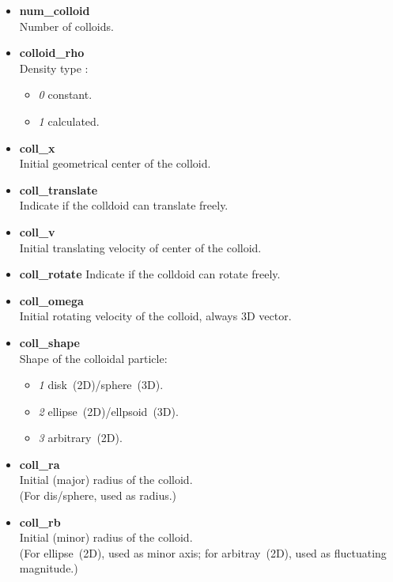 \documentclass[a4paper,10pt]{article}
\begin{document}
\begin{itemize}
 
\item  
\textbf{num\_colloid} \\
Number of colloids.

\item 
\textbf{colloid\_rho}  \\
Density type :
\begin{itemize}
\item
\textit{0} constant.
\item 
\textit{1} calculated.
\end{itemize}

\item 
\textbf{coll\_x}   \\
Initial geometrical center of the colloid.

\item 
\textbf{coll\_translate} \\
Indicate if the colldoid can translate freely.

\item 
\textbf{coll\_v}\\
Initial translating velocity of center of the colloid.

\item 
\textbf{coll\_rotate}
Indicate if the colldoid can rotate freely.

\item 
\textbf{coll\_omega}  \\
Initial rotating velocity of the colloid, always 3D vector.

\item 
\textbf{coll\_shape} \\
Shape of the colloidal particle:
\begin{itemize}
\item \textit{1} disk~(2D)/sphere~(3D).
\item \textit{2} ellipse~(2D)/ellpsoid~(3D).
\item \textit{3} arbitrary~(2D).
\end{itemize}

\item  
\textbf{coll\_ra} \\
Initial (major) radius of the colloid.\\
(For dis/sphere, used as radius.)

\item 
\textbf{coll\_rb} \\
Initial (minor) radius of the colloid.\\
(For ellipse~(2D), used as minor axis;
for arbitray~(2D), used as fluctuating magnitude.)


\end{itemize}
\end{document}
